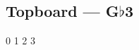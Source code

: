 \subsection{Topboard --- \UiKey{\I}\UiKey{\SET}G$\flat$3}









































0
1
2
3
